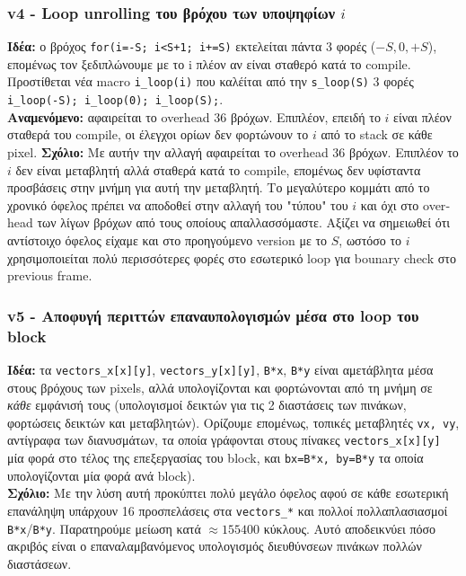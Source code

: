\documentclass[11pt,a4paper]{article}
\newcommand{\code}[1]{\texttt{#1}}
\newcommand{\en}[1]{\foreignlanguage{english}{#1}}
\begin{document}
\subsubsection{v4 - \en{Loop unrolling} του βρόχου των υποψηφίων $i$}
\textbf{Ιδέα:} ο βρόχος \code{for(i=-S; i<S+1; i+=S)} εκτελείται πάντα 3 φορές ($-S,0,+S$), επομένως τον
ξεδιπλώνουμε με το i πλέον αν είναι σταθερό κατά το compile. Προστίθεται νέα \en{macro} \code{i\_loop(i)} που καλέίται από την \code{s\_loop(S)} 3 φορές
\code{i\_loop(-S); i\_loop(0); i\_loop(S);}.\\
\textbf{Αναμενόμενο:} αφαιρείται το \en{overhead} 36 βρόχων. Επιπλέον, επειδή το $i$ είναι πλέον σταθερά του compile, οι έλεγχοι ορίων
δεν φορτώνουν το $i$ από το stack σε κάθε \en{pixel}.
\textbf{Σχόλιο:} Με αυτήν την αλλαγή αφαιρείται το \en{overhead} 36 βρόχων. Επιπλέον το $i$ δεν είναι μεταβλητή αλλά σταθερά κατά το compile, επομένως δεν υφίσταντα προσβάσεις στην μνήμη για αυτή την μεταβλητή. Το μεγαλύτερο κομμάτι από το χρονικό όφελος πρέπει να αποδοθεί στην αλλαγή του "τύπου" του $i$ και όχι στο \en{overhead} των λίγων 
βρόχων από τους οποίους απαλλασσόμαστε. Αξίζει να σημειωθεί ότι αντίστοιχο όφελος είχαμε και στο προηγούμενο version με το $S$, ωστόσο το $i$ χρησιμοποιείται πολύ περισσότερες φορές στο εσωτερικό loop για bounary check στο previous frame.

\subsubsection{v5 - Αποφυγή περιττών επαναυπολογισμών μέσα στο \en{loop} του \en{block}}
\textbf{Ιδέα:} τα \code{vectors\_x[x][y]}, \code{vectors\_y[x][y]}, \code{B*x}, \code{B*y} είναι
αμετάβλητα μέσα στους βρόχους των \en{pixels}, αλλά υπολογίζονται και φορτώνονται από
τη μνήμη σε \emph{κάθε} εμφάνισή τους (υπολογισμοί δεικτών για τις 2 διαστάσεις των πινάκων, φορτώσεις
δεικτών και μεταβλητών). Ορίζουμε επομένως, τοπικές μεταβλητές \code{vx, vy}, αντίγραφα των διανυσμάτων, τα οποία γράφονται στους
πίνακες \code{vectors\_x[x][y]} μία φορά στο τέλος της επεξεργασίας του block, και \code{bx=B*x, by=B*y} τα οποία υπολογίζονται μία φορά ανά block).\\
\textbf{Σχόλιο:} Με την λύση αυτή προκύπτει πολύ μεγάλο όφελος αφού σε κάθε εσωτερική επανάληψη υπάρχουν 16 προσπελάσεις στα
\code{vectors\_*} και πολλοί πολλαπλασιασμοί \code{B*x}/\code{B*y}. Παρατηρούμε μείωση κατά $\approx\num{155400}$ κύκλους. Αυτό αποδεικνύει πόσο ακριβός είναι ο επαναλαμβανόμενος υπολογισμός διευθύνσεων πινάκων πολλών διαστάσεων.
\end{document}
